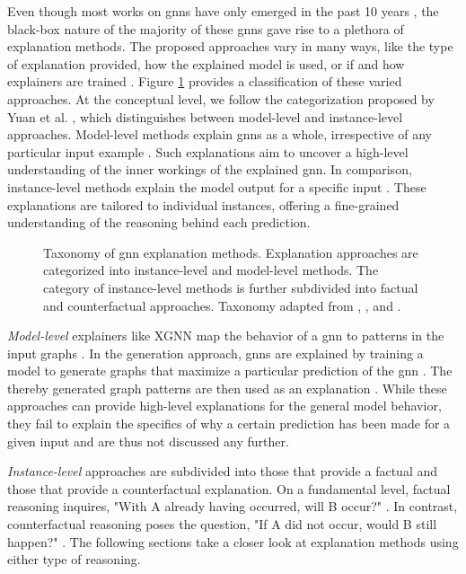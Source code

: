 Even though most works on \glspl{gnn} have only emerged in the past 10 years \cite{wu_comprehensive_2021}, the black-box nature of the majority of these \glspl{gnn} gave rise to a plethora of explanation methods. The proposed approaches vary in many ways, like the type of explanation provided, how the explained model is used, or if and how explainers are trained \cite{kakkad_survey_2023}. Figure \ref{f_taxonomy_explainers} provides a classification of these varied approaches. At the conceptual level, we follow the categorization proposed by Yuan et al. \cite{yuan_explainability_2020}, which distinguishes between model-level and instance-level approaches. Model-level methods explain \glspl{gnn} as a whole, irrespective of any particular input example \cite{yuan_explainability_2020}. Such explanations aim to uncover a high-level understanding of the inner workings of the explained \gls{gnn}. In comparison, instance-level methods explain the model output for a specific input \cite{yuan_explainability_2020}. These explanations are tailored to individual instances, offering a fine-grained understanding of the reasoning behind each prediction.

\begin{figure}[ht]
    \centering
    
    \caption{Taxonomy of \gls{gnn} explanation methods. Explanation approaches are categorized into instance-level and model-level methods. The category of instance-level methods is further subdivided into factual and counterfactual approaches. Taxonomy adapted from \cite{yuan_explainability_2020}, \cite{prado-romero_survey_2023}, and \cite{kakkad_survey_2023}.}
    \label{f_taxonomy_explainers}
\end{figure}

\textit{Model-level} explainers like XGNN \cite{yuan_xgnn_2020} map the behavior of a \gls{gnn} to patterns in the input graphs \cite{yuan_explainability_2020}. In the generation approach, \glspl{gnn} are explained by training a model to generate graphs that maximize a particular prediction of the \gls{gnn} \cite{yuan_explainability_2020, yuan_xgnn_2020}. The thereby generated graph patterns are then used as an explanation \cite{yuan_xgnn_2020}. While these approaches can provide high-level explanations for the general model behavior, they fail to explain the specifics of why a certain prediction has been made for a given input and are thus not discussed any further.

\textit{Instance-level} approaches are subdivided into those that provide a factual and those that provide a counterfactual explanation. On a fundamental level, factual reasoning inquires, "With A already having occurred, will B occur?" \cite{quelhas_relation_2018, tan_learning_2022}. In contrast, counterfactual reasoning poses the question, "If A did not occur, would B still happen?" \cite{quelhas_relation_2018, tan_learning_2022}. The following sections take a closer look at explanation methods using either type of reasoning.

